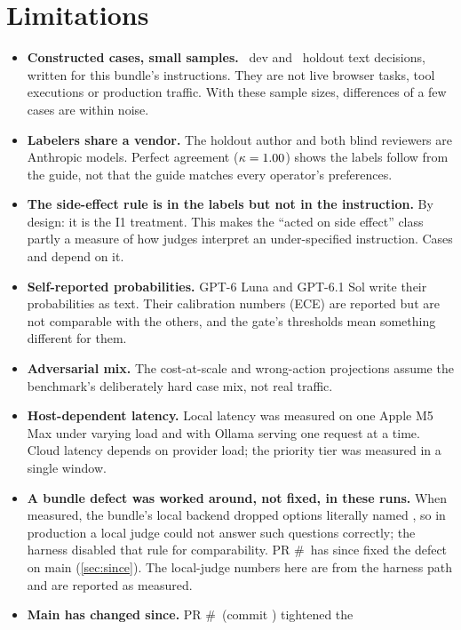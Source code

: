 \section{Limitations}\label{sec:limits}

\begin{itemize}
  \item \textbf{Constructed cases, small samples.} \DevN\ dev and \HoldN\ holdout text decisions, written
    for this bundle's instructions. They are not live browser tasks, tool executions or production
    traffic. With these sample sizes, differences of a few cases are within noise.
  \item \textbf{Labelers share a vendor.} The holdout author and both blind reviewers are Anthropic
    models. Perfect agreement ($\kappa = 1.00$) shows the labels follow from the guide, not that
    the guide matches every operator's preferences.
  \item \textbf{The side-effect rule is in the labels but not in the instruction.} By design: it is the
    I1 treatment. This makes the ``acted on side effect'' class partly a measure of how judges interpret
    an under-specified instruction. Cases  and  depend on it.
  \item \textbf{Self-reported probabilities.} GPT-6 Luna and GPT-6.1 Sol write their probabilities as
    text. Their calibration numbers (ECE) are reported but are not comparable with the others, and the
    gate's thresholds mean something different for them.
  \item \textbf{Adversarial mix.} The cost-at-scale and wrong-action projections assume the benchmark's
    deliberately hard case mix, not real traffic.
  \item \textbf{Host-dependent latency.} Local latency was measured on one Apple M5 Max under varying load
    and with Ollama serving one request at a time. Cloud latency depends on provider load; the priority
    tier was measured in a single window.
  \item \textbf{A bundle defect was worked around, not fixed, in these runs.} When measured, the
    bundle's local backend dropped options literally named , so in production a local judge
    could not answer such questions correctly; the harness disabled that rule for comparability. PR
    \#\SincePR\ has since fixed the defect on main (\cref{sec:since}). The local-judge numbers here are
    from the harness path and are reported as measured.
  \item \textbf{Main has changed since.} PR \#\SincePR\ (commit \code{\SinceCommit}) tightened the

\end{itemize}

